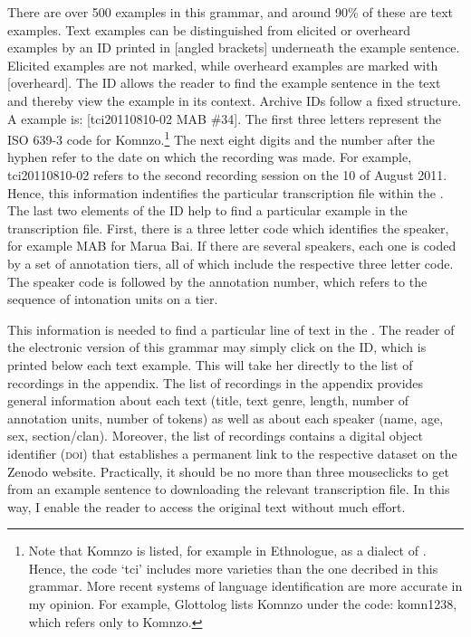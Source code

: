 There are over 500 examples in this grammar, and around 90\% of these are text examples. Text examples can be distinguished from elicited or overheard examples by an  ID printed in [angled brackets] underneath the example sentence. Elicited examples are not marked, while overheard examples are marked with [overheard]. The  ID allows the reader to find the example sentence in the text  and thereby view the example in its context. Archive IDs follow a fixed structure. A example is: [tci20110810-02 MAB \#34]. The first three letters represent the ISO 639-3 code for Komnzo.\footnote{Note that Komnzo is listed, for example in Ethnologue, as a dialect of . Hence, the code `tci' includes more varieties than the one decribed in this grammar. More recent systems of language identification are more accurate in my opinion. For example, Glottolog lists Komnzo under the code: komn1238, which refers only to Komnzo.} The next eight digits and the number after the hyphen refer to the date on which the recording was made. For example, tci20110810-02 refers to the second recording session on the 10 of August 2011.  Hence, this information indentifies the particular transcription file within the . The last two elements of the  ID help to find a particular example in the transcription file. First, there is a three letter code which identifies the speaker, for example MAB for Marua Bai. If there are several speakers, each one is coded by a set of annotation tiers, all of which include the respective three letter code. The speaker code is followed by the annotation number, which refers to the sequence of intonation units on a tier.%

This information is needed to find a particular line of text in the . The reader of the electronic version of this grammar may simply click on the  ID, which is printed below each text example. This will take her directly to the list of recordings in the appendix. The list of recordings in the appendix provides general information about each text (title, text genre, length, number of annotation units, number of tokens) as well as about each speaker (name, age, sex, section/clan). Moreover, the list of recordings contains a digital object identifier (\textsc{doi}) that establishes a permanent link to the respective dataset on the Zenodo website. Practically, it should be no more than three mouseclicks to get from an example sentence to downloading the relevant transcription file. In this way, I enable the reader to access the original text without much effort.